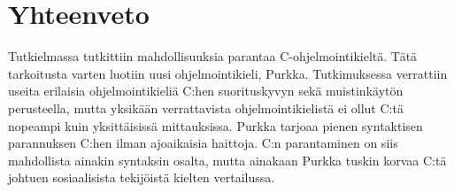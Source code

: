 \section{Yhteenveto}

Tutkielmassa tutkittiin mahdollisuuksia parantaa C-ohjelmointikieltä. Tätä
tarkoitusta varten luotiin uusi ohjelmointikieli, Purkka. Tutkimuksessa
verrattiin useita erilaisia ohjelmointikieliä C:hen suorituskyvyn sekä
muistinkäytön perusteella, mutta yksikään verrattavista ohjelmointikielistä ei
ollut C:tä nopeampi kuin yksittäisissä mittauksissa. Purkka tarjoaa pienen
syntaktisen parannuksen C:hen ilman ajoaikaisia haittoja. C:n parantaminen on
siis mahdollista ainakin syntaksin osalta, mutta ainakaan Purkka tuskin korvaa
C:tä johtuen sosiaalisista tekijöistä kielten vertailussa.

